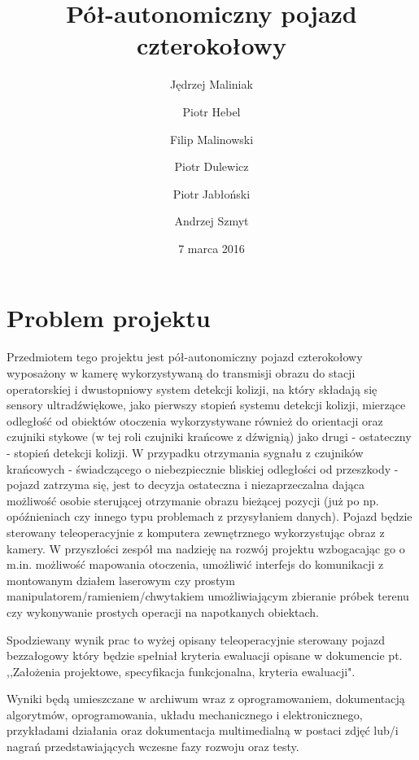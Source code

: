 \documentclass[a4paper]{article}
\title{Pół-autonomiczny pojazd czterokołowy}
\author{Jędrzej Maliniak \and Piotr Hebel \and Filip Malinowski \and Piotr Dulewicz \and Piotr Jabłoński \and Andrzej Szmyt}
\date{7 marca 2016}
\begin{document}
\maketitle

\section{Problem projektu}
    Przedmiotem tego projektu jest pół-autonomiczny pojazd czterokołowy wyposażony w kamerę wykorzystywaną do transmisji obrazu do stacji operatorskiej i dwustopniowy system detekcji kolizji, na który składają się sensory ultradźwiękowe, jako pierwszy stopień systemu detekcji kolizji, mierzące odległość od obiektów otoczenia wykorzystywane również do orientacji oraz czujniki stykowe (w tej roli czujniki krańcowe z dźwignią) jako drugi - ostateczny - stopień  detekcji kolizji. W przypadku otrzymania sygnału z czujników krańcowych - świadczącego o niebezpiecznie bliskiej odległości od przeszkody - pojazd zatrzyma się, jest to decyzja ostateczna i niezaprzeczalna dająca możliwość osobie sterującej otrzymanie obrazu bieżącej pozycji (już po np. opóźnieniach czy innego typu problemach z przysyłaniem danych). Pojazd będzie sterowany teleoperacyjnie z komputera zewnętrznego wykorzystując obraz z kamery. W przyszłości zespół ma nadzieję na rozwój projektu wzbogacając go o m.in. możliwość mapowania otoczenia, umożliwić interfejs do komunikacji z montowanym działem laserowym czy prostym manipulatorem/ramieniem/chwytakiem umożliwiającym zbieranie próbek terenu czy wykonywanie prostych operacji na napotkanych obiektach.
    
    Spodziewany wynik prac to wyżej opisany teleoperacyjnie sterowany pojazd bezzałogowy który będzie spełniał kryteria ewaluacji opisane w dokumencie pt. ,,Założenia projektowe, specyfikacja funkcjonalna, kryteria ewaluacji".

    Wyniki będą umieszczane w archiwum wraz z oprogramowaniem, dokumentacją algorytmów, oprogramowania, układu mechanicznego i elektronicznego, przykładami działania oraz dokumentacja multimedialną w postaci zdjęć lub/i nagrań przedstawiających wczesne fazy rozwoju oraz testy.
\end{document}
